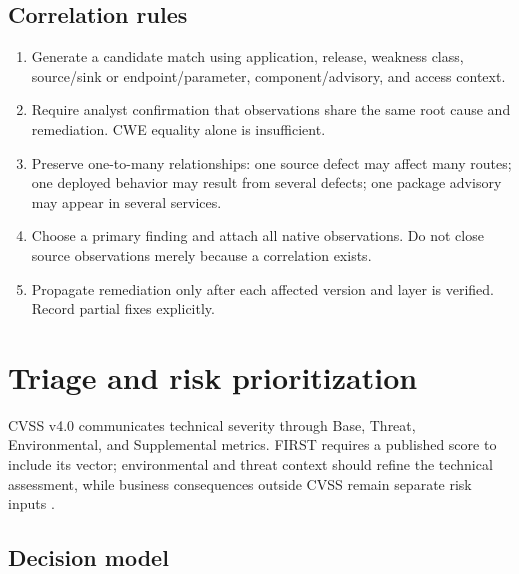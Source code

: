 \documentclass[11pt,letterpaper]{article}
\begin{document}
\subsection{Correlation rules}

\begin{enumerate}
  \item Generate a candidate match using application, release, weakness class, source/sink or endpoint/parameter, component/advisory, and access context.
  \item Require analyst confirmation that observations share the same root cause and remediation. CWE equality alone is insufficient.
  \item Preserve one-to-many relationships: one source defect may affect many routes; one deployed behavior may result from several defects; one package advisory may appear in several services.
  \item Choose a primary finding and attach all native observations. Do not close source observations merely because a correlation exists.
  \item Propagate remediation only after each affected version and layer is verified. Record partial fixes explicitly.
\end{enumerate}

\section{Triage and risk prioritization}

CVSS v4.0 communicates technical severity through Base, Threat, Environmental, and Supplemental metrics. FIRST requires a published score to include its vector; environmental and threat context should refine the technical assessment, while business consequences outside CVSS remain separate risk inputs \citep{firstcvss}.

\subsection{Decision model}
\end{document}
